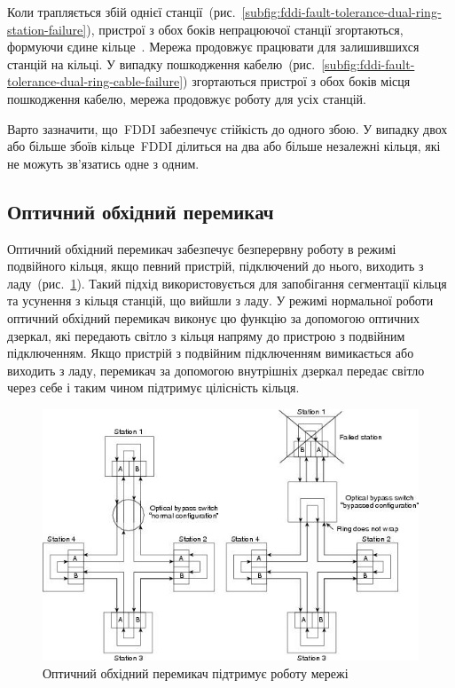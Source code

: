 \documentclass[
	a4paper,
	oneside,
	BCOR = 10mm,
	DIV = 12,
	12pt,
	headings = normal,
]{scrartcl}
\begin{document}
			Коли трапляється збій однієї станції~(рис.~\ref{subfig:fddi-fault-tolerance-dual-ring-station-failure}), пристрої з обох боків непрацюючої станції згортаються, формуючи єдине кільце~\cite{olifer-networks-4th-ed}. Мережа продовжує працювати для залишившихся станцій на кільці. У випадку пошкодження кабелю~(рис.~\ref{subfig:fddi-fault-tolerance-dual-ring-cable-failure}) згортаються пристрої з обох боків місця пошкодження кабелю, мережа продовжує роботу для усіх станцій.

			Варто зазначити, що~\textenglish{FDDI} забезпечує стійкість до одного збою. У випадку двох або більше збоїв кільце~\textenglish{FDDI} ділиться на два або більше незалежні кільця, які не можуть зв'язатись одне з одним.

		\subsection{Оптичний обхідний перемикач}
			Оптичний обхідний перемикач забезпечує безперервну роботу в режимі подвійного кільця, якщо певний пристрій, підключений до нього, виходить з ладу~(рис.~\ref{fig:optical-bypass-switch}). Такий підхід використовується для запобігання сегментації кільця та усунення з кільця станцій, що вийшли з ладу. У режимі нормальної роботи оптичний обхідний перемикач виконує цю функцію за допомогою оптичних дзеркал, які передають світло з кільця напряму до пристрою з подвійним підключенням. Якщо пристрій з подвійним підключенням вимикається або виходить з ладу, перемикач за допомогою внутрішніх дзеркал передає світло через себе і таким чином підтримує цілісність кільця.

			\begin{figure}[!htbp]
				\centering
				\includegraphics[height = 10\baselineskip]{./assets/y03s01-telecom-homework-01-p07-optical-bypass-switch.jpg}
				\caption{Оптичний обхідний перемикач підтримує роботу мережі}
				\label{fig:optical-bypass-switch}
			\end{figure}
\end{document}
